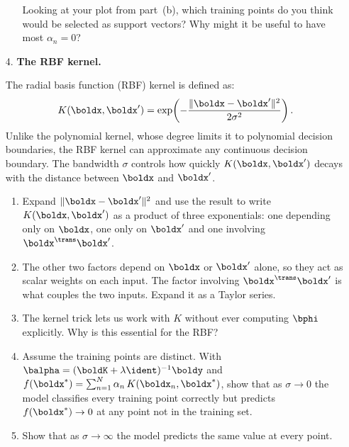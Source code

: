 \documentclass[submit]{../harvardml}
\begin{document}
\begin{problem}
\begin{enumerate}
\begin{enumerate}
    Looking at your plot from part~(b), which training points do you
    think would be selected as support vectors? Why might it be
    useful to have most $\alpha_n = 0$?
  \end{enumerate}

  \item[4.] \textbf{The RBF kernel.}

  The radial basis function (RBF) kernel is defined as:
  \[
    K(\boldx, \boldx') = \exp\!\left(-\frac{\|\boldx - \boldx'\|^2}{2\sigma^2}\right).
  \]
  Unlike the polynomial kernel, whose degree limits it to polynomial
  decision boundaries, the RBF kernel can approximate any continuous
  decision boundary. The bandwidth $\sigma$ controls how quickly
  $K(\boldx, \boldx')$ decays with the distance between $\boldx$
  and $\boldx'$.

  \begin{enumerate}
    \item Expand $\|\boldx - \boldx'\|^2$ and use the result to write
    $K(\boldx, \boldx')$ as a product of three exponentials: one
    depending only on $\boldx$, one only on $\boldx'$ and one
    involving $\boldx^\trans \boldx'$.

    \item The other two factors depend on $\boldx$ or $\boldx'$ alone,
    so they act as scalar weights on each input. The factor involving
    $\boldx^\trans \boldx'$ is what couples the two inputs. Expand it
    as a Taylor series.

    \item The kernel trick lets us work with $K$ without ever
    computing $\bphi$ explicitly. Why is this essential for the RBF?

    \item Assume the training points are distinct. With
    $\balpha = (\boldK + \lambda \ident)^{-1} \boldy$ and
    $f(\boldx^*) = \sum_{n=1}^N \alpha_n \, K(\boldx_n, \boldx^*)$,
    show that as $\sigma \to 0$ the model classifies every training
    point correctly but predicts $f(\boldx^*) \to 0$ at any point
    not in the training set.

    \item Show that as $\sigma \to \infty$ the model predicts the
    same value at every point.
  \end{enumerate}

\end{enumerate}
\end{problem}

\newpage
\end{document}
